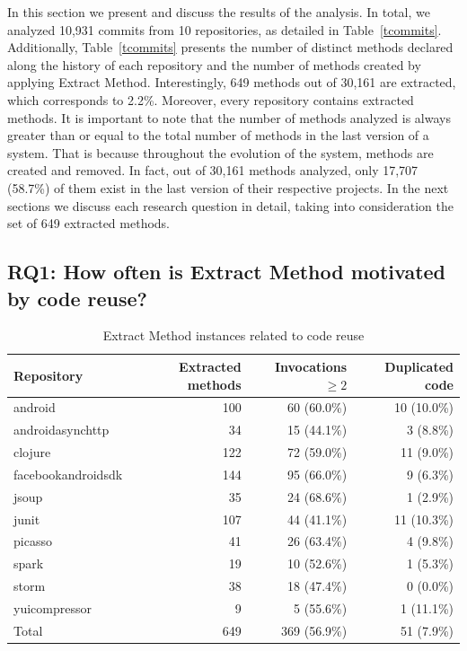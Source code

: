 In this section we present and discuss the results of the analysis. In total, we analyzed 10,931 commits from 10 repositories, as detailed in Table~\ref{tcommits}.
Additionally, Table~\ref{tcommits} presents the number of distinct methods declared along the history of each repository and the number of methods created by applying Extract Method.
Interestingly, 649 methods out of 30,161 are extracted, which corresponds to 2.2\%. Moreover, every repository contains extracted methods.
It is important to note that the number of methods analyzed is always greater than or equal to the total number of methods in the last version of a system. That is because throughout the evolution of the system, methods are created and removed. In fact, out of 30,161 methods analyzed, only 17,707 (58.7\%) of them exist in the last version of their respective projects.
In the next sections we discuss each research question in detail, taking into consideration the set of 649 extracted methods.

\subsection{RQ1: How often is Extract Method motivated by code reuse?}


\begin{table}[b]\centering
\renewcommand{\arraystretch}{1.3}
\caption{Extract Method instances related to code reuse}
\begin{tabular}{@{}lrrr@{}}\toprule
Repository & Extracted methods & Invocations $\geq 2$ & Duplicated code\\
\midrule
android & 100 & 60 (60.0\%) & 10 (10.0\%) \\
android\-async\-http & 34 & 15 (44.1\%) & 3 (8.8\%) \\
clojure & 122 & 72 (59.0\%) & 11 (9.0\%) \\
facebook\-android\-sdk & 144 & 95 (66.0\%) & 9 (6.3\%) \\
jsoup & 35 & 24 (68.6\%) & 1 (2.9\%) \\
junit & 107 & 44 (41.1\%) & 11 (10.3\%) \\
picasso & 41 & 26 (63.4\%) & 4 (9.8\%) \\
spark & 19 & 10 (52.6\%) & 1 (5.3\%) \\
storm & 38 & 18 (47.4\%) & 0 (0.0\%) \\
yuicompressor & 9 & 5 (55.6\%) & 1 (11.1\%) \\
\midrule
Total & 649 & 369 (56.9\%) & 51 (7.9\%) \\
\bottomrule
\end{tabular}
\label{treuse}
\end{table}


